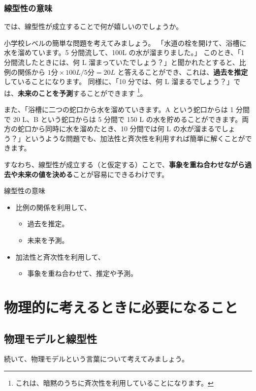 \documentclass[uplatex,dvipdfmx,a4paper,11pt]{jsreport}
\begin{document}
\subsubsection{線型性の意味}

では、線型性が成立することで何が嬉しいのでしょうか。

小学校レベルの簡単な問題を考えてみましょう。
「水道の栓を開けて、浴槽に水を溜めています。5 分間流して、100L の水が溜まりました。」
このとき、「1 分間流したときには、何 L 溜まっていたでしょう？」と聞かれたとすると、比例の関係から $1 \text{分} \times 100 L /5 \text{分}= 20 L$ と答えることができ、これは、\textbf{過去を推定}していることになります。
同様に、「10 分では、何 L 溜まるでしょう？」では、\textbf{未来のことを予測}することができます
\footnote{
	これは、暗黙のうちに斉次性を利用していることになります。
}。

また、「浴槽に二つの蛇口から水を溜めていきます。A という蛇口からは 1 分間で 20 L、B という蛇口からは 5 分間で 150 L の水を貯めることができます。両方の蛇口から同時に水を溜めたとき、10 分間では何 L の水が溜まるでしょう？」というような問題でも、加法性と斉次性を利用すれば簡単に解くことができます。

すなわち、線型性が成立する（と仮定する）ことで、\textbf{事象を重ね合わせながら過去や未来の値を決める}ことが容易にできるわけです。
\large
	\begin{itembox}[l]{線型性の意味}
		\begin{itemize}
			\item 比例の関係を利用して、
			\begin{itemize}
				\item 過去を推定。
				\item 未来を予測。
			\end{itemize}
			\item 加法性と斉次性を利用して、
			\begin{itemize}
				\item 事象を重ね合わせて、推定や予測。
			\end{itemize}
		\end{itemize}
	\end{itembox}
\normalsize

\section{物理的に考えるときに必要になること}

\subsection{物理モデルと線型性}
続いて、物理モデルという言葉について考えてみましょう。
\end{document}
